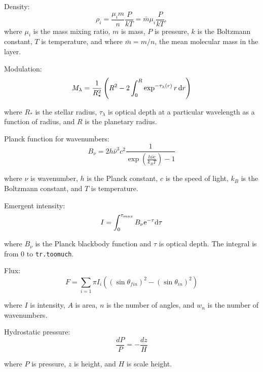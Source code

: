 \documentclass[letterpaper,12pt]{article}
\begin{document}
\noindent
Density:
\begin{equation}
\label{eqn:den}
  \rho_i = \frac{\mu_im}{n}\frac{P}{kT} = \bar{m}\mu_i\frac{P}{kT},
\end{equation}
\noindent
where $\mu_i$ is the mass mixing ratio, $m$ is mass, $P$ is pressure, $k$ is the Boltzmann constant, $T$ is temperature, and where $\bar{m} = m/n$, the mean molecular mass in the layer.\newline

\noindent
Modulation:
\begin{equation}
\label{eqn:mod}
M_{\lambda} = \frac{1}{R_\star^2}\left(R^2 - 2\int_{0}^{R} \exp^{-\tau_\lambda(r)} r\,{\rm d}r\right)
\end{equation}

\noindent
where $R_{*}$ is the stellar radius, $\tau_\lambda$ is optical depth at a particular wavelength as a function of radius, and $R$ is the planetary radius. \newline

\noindent
Planck function for wavenumbers:
\begin{equation}
\label{eqn:planck}
B_\nu = 2 h {\bar\nu}^3 c^2 \frac{1}{\exp(\frac{h \bar \nu c}{k_B T})-1}
\end{equation}

\noindent
where $\nu$ is wavenumber, $h$ is the Planck constant, $c$ is the speed of light, $k_B$ is the Boltzmann constant, and $T$ is temperature. \newline

\noindent
Emergent intensity:
\begin{equation}
\label{eqn:intens}
I = \int_0\sp{\tau\sb{max}} B_\nu \mathrm{e}^{-\tau} \mathrm{d}\tau
\end{equation}

\noindent
where $B_\nu$ is the Planck blackbody function and $\tau$ is optical depth. The integral is from $0$ to {\tt tr.toomuch}. \newline

\noindent
Flux:
\begin{equation}
\label{eqn:flux}
F = \sum\limits_{i=1} \pi I_i ((\sin{\theta_{fin}})^2 - (\sin{\theta_{in}})^2)
\end{equation}

\noindent
where $I$ is intensity, $A$ is area, $n$ is the number of angles, and $w_n$ is the number of wavenumbers. \newline

\noindent
Hydrostatic pressure:
\begin{equation}
\label{eqn:hydrostatic}
\frac{dP}{P} = -\frac{dz}{H}
\end{equation}

\noindent
where $P$ is pressure, $z$ is height, and $H$ is scale height. \newline
%
\end{document}
